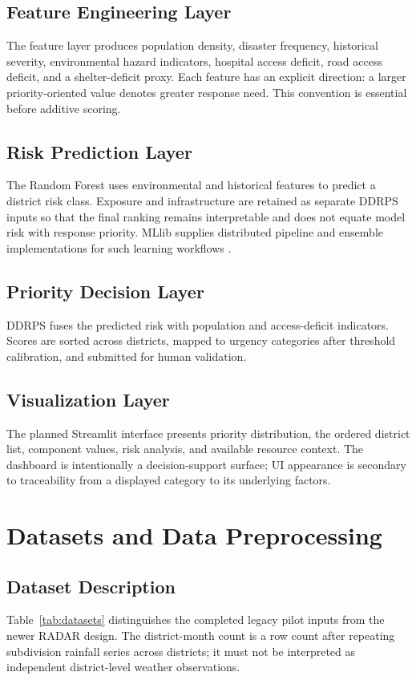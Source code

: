\documentclass[conference]{IEEEtran}
\begin{document}
\subsection{Feature Engineering Layer}
The feature layer produces population density, disaster frequency, historical
severity, environmental hazard indicators, hospital access deficit, road access
deficit, and a shelter-deficit proxy. Each feature has an explicit direction:
a larger priority-oriented value denotes greater response need. This convention
is essential before additive scoring.

\subsection{Risk Prediction Layer}
The Random Forest uses environmental and historical features to predict a
district risk class. Exposure and infrastructure are retained as separate DDRPS
inputs so that the final ranking remains interpretable and does not equate model
risk with response priority. MLlib supplies distributed pipeline and ensemble
implementations for such learning workflows \cite{mllib}.

\subsection{Priority Decision Layer}
DDRPS fuses the predicted risk with population and access-deficit indicators.
Scores are sorted across districts, mapped to urgency categories after threshold
calibration, and submitted for human validation.

\subsection{Visualization Layer}
The planned Streamlit interface presents priority distribution, the ordered
district list, component values, risk analysis, and available resource context.
The dashboard is intentionally a decision-support surface; UI appearance is
secondary to traceability from a displayed category to its underlying factors.

\section{Datasets and Data Preprocessing}

\subsection{Dataset Description}
Table~\ref{tab:datasets} distinguishes the completed legacy pilot inputs from
the newer RADAR design. The district-month count is a row count after repeating
subdivision rainfall series across districts; it must not be interpreted as
independent district-level weather observations.
\end{document}
